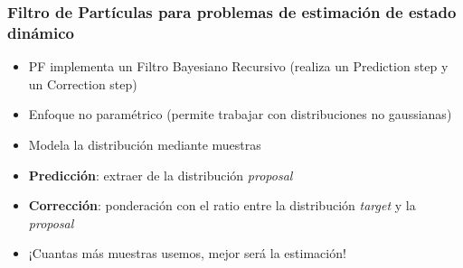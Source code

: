 \begin{frame}
    \frametitle{Filtro de Partículas para problemas de estimación de estado dinámico}

    \begin{itemize}
        \item PF implementa un Filtro Bayesiano Recursivo (realiza un Prediction step y un Correction step)
        \item Enfoque no paramétrico (permite trabajar con distribuciones no gaussianas)
        \item Modela la distribución mediante muestras
        \item \textbf{Predicción}: extraer de la distribución \emph{proposal}
        \item \textbf{Corrección}: ponderación con el ratio entre la distribución \emph{target} y la \emph{proposal}
        \item \alert{¡Cuantas más muestras usemos, mejor será la estimación!}
    \end{itemize}
\end{frame}
    
